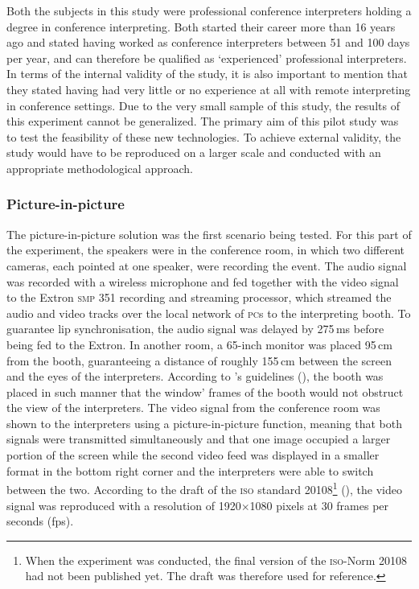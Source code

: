 \documentclass[output=paper]{langsci/langscibook}
\begin{document}
Both the subjects in this study were professional conference interpreters holding a degree in conference interpreting. Both started their career more than 16 years ago and stated having worked as conference interpreters between 51 and 100 days per year, and can therefore be qualified as ‘experienced’ professional interpreters. In terms of the internal validity of the study, it is also important to mention that they stated having had very little or no experience at all with remote interpreting in conference settings. Due to the very small sample of this study, the results of this experiment cannot be generalized. The primary aim of this pilot study was to test the feasibility of these new technologies. To achieve external validity, the study would have to be reproduced on a larger scale and conducted with an appropriate methodological approach.

\subsubsection{Picture-in-picture} 
\largerpage
The picture-in-picture solution was the first scenario being tested. For this part of the experiment, the speakers were in the conference room, in which two different cameras, each pointed at one speaker, were recording the event. The audio signal was recorded with a wireless microphone and fed together with the video signal to the Extron \textsc{smp 351} recording and streaming processor, which streamed the audio and video tracks over the local network of \textsc{pc}s to the interpreting booth. To guarantee lip synchronisation, the audio signal was delayed by 275\,ms before being fed to the Extron. In another room, a 65-inch monitor was placed 95\,cm from the booth, guaranteeing a distance of roughly 155\,cm between the screen and the eyes of the interpreters. According to \citeauthor{Causo2011}’s guidelines (\citeyear[2]{Causo2011}), the booth was placed in such manner that the window’ frames of the booth would not obstruct the view of the interpreters. The video signal from the conference room was shown to the interpreters using a picture-in-picture function, meaning that both signals were transmitted simultaneously and that one image occupied a larger portion of the screen while the second video feed was displayed in a smaller format in the bottom right corner and the interpreters were able to switch between the two. According to the draft of the \textsc{iso} standard 20108\footnote{When the experiment was conducted, the final version of the \textsc{iso}-Norm 20108 had not been published yet. The draft was therefore used for reference.} (\citeyear[6]{ISO20108}), the video signal was reproduced with a resolution of 1920$\times$1080 pixels at 30 frames per seconds (fps). 
\end{document}
